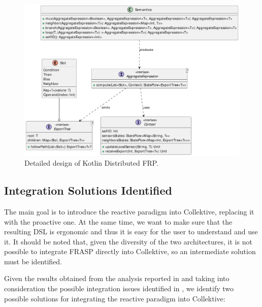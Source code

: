 \begin{figure}
    \centering
    \includegraphics[width=\linewidth]{figures/kotlin-distributed-frp-design.pdf}
    \caption{Detailed design of Kotlin Distributed FRP.}
    \label{fig:kotlin-distributed-frp-design}
\end{figure}



\subsection{Integration Solutions Identified}
\label{subsection:integration-solutions-identified}

The main goal is to introduce the reactive paradigm into Collektive, replacing it with the proactive one. At the same time, we want to make sure that the resulting DSL is ergonomic and thus it is easy for the user to understand and use it. It should be noted that, given the diversity of the two architectures, it is not possible to integrate FRASP directly into Collektive, so an intermediate solution must be identified.

Given the results obtained from the analysis reported in  and taking into consideration the possible integration issues identified in , we identify two possible solutions for integrating the reactive paradigm into Collektive:

